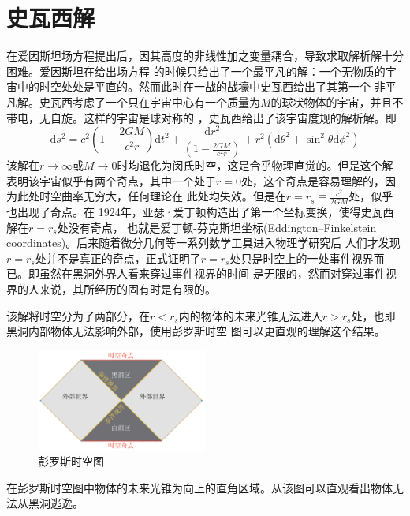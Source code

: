 \documentclass{article}
\renewcommand{\d}{\mathrm{d}}
\begin{document}
\section{史瓦西解}
在爱因斯坦场方程提出后，因其高度的非线性加之变量耦合，导致求取解析解十分困难。爱因斯坦在给出场方程
的时候只给出了一个最平凡的解：一个无物质的宇宙中的时空处处是平直的。然而此时在一战的战壕中史瓦西给出了其第一个
非平凡解。史瓦西考虑了一个只在宇宙中心有一个质量为$M$的球状物体的宇宙，并且不带电，无自旋。这样的宇宙是球对称的
，史瓦西给出了该宇宙度规的解析解。即
\begin{equation}
    \d s^2=c^2\left(1-\frac{2GM}{c^2r}\right)\d t^2+\frac{\d r^2}{\left(1-\frac{2GM}{c^2r}\right)}+r^2(\d \theta^2+\sin^2\theta\d \phi^2)
\end{equation}
该解在$r\to\infty$或$M\to0$时均退化为闵氏时空，这是合乎物理直觉的。但是这个解表明该宇宙似乎有两个奇点，其中一个处于$r=0$处，这个奇点是容易理解的，因为此处时空曲率无穷大，任何理论在
此处均失效。但是在$r=r_s\equiv\frac{c^2}{2GM}$处，似乎也出现了奇点。在 1924年，亚瑟·爱丁顿构造出了第一个坐标变换，使得史瓦西解在$r=r_s$处没有奇点，
也就是爱丁顿-芬克斯坦坐标(Eddington–Finkelstein coordinates)。后来随着微分几何等一系列数学工具进入物理学研究后
人们才发现$r=r_s$处并不是真正的奇点，正式证明了$r=r_s$处只是时空上的一处事件视界而已。即虽然在黑洞外界人看来穿过事件视界的时间
是无限的，然而对穿过事件视界的人来说，其所经历的固有时是有限的。\par
该解将时空分为了两部分，在$r<r_s$内的物体的未来光锥无法进入$r>r_s$处，也即黑洞内部物体无法影响外部，使用彭罗斯时空
图可以更直观的理解这个结果。
\begin{figure}[H]
    \centering
    \includegraphics[width=0.5\textwidth]{20210121064530_a51be8.jpg}
    \caption{彭罗斯时空图}
\end{figure}
在彭罗斯时空图中物体的未来光锥为向上的直角区域。从该图可以直观看出物体无法从黑洞逃逸。
\end{document}
